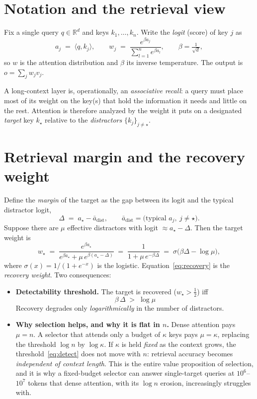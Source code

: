 \documentclass[11pt]{article}
\numberwithin{equation}{section}
\newcommand{\R}{\mathbb{R}}
\newcommand{\inner}[2]{\langle #1, #2\rangle}
\begin{document}
\section{Notation and the retrieval view}

Fix a single query $q\in\R^d$ and keys $k_1,\dots,k_n$. Write the \emph{logit} (score) of key $j$ as
\[
a_j \;=\; \inner{q}{k_j}, \qquad
w_j \;=\; \frac{e^{\beta a_j}}{\sum_{l=1}^n e^{\beta a_l}}, \qquad \beta = \tfrac{1}{\sqrt d},
\]
so $w$ is the attention distribution and $\beta$ its inverse temperature. The output is $o=\sum_j w_j v_j$.

A long-context layer is, operationally, an \emph{associative recall}: a query must place most of its weight on
the key(s) that hold the information it needs and little on the rest. Attention is therefore analyzed by the
weight it puts on a designated \emph{target} key $k_\star$ relative to the \emph{distractors}
$\{k_j\}_{j\neq\star}$.

\section{Retrieval margin and the recovery weight}\label{sec:margin}

Define the \emph{margin} of the target as the gap between its logit and the typical distractor logit,
\[
\Delta \;=\; a_\star - \bar a_{\text{dist}}, \qquad \bar a_{\text{dist}} = \text{(typical } a_j,\ j\neq\star).
\]
Suppose there are $\mu$ effective distractors with logit $\approx a_\star-\Delta$. Then the target weight is
\begin{equation}\label{eq:recovery}
w_\star \;=\; \frac{e^{\beta a_\star}}{e^{\beta a_\star}+\mu\,e^{\beta(a_\star-\Delta)}}
\;=\; \frac{1}{1+\mu\,e^{-\beta\Delta}}
\;=\; \sigma\!\big(\beta\Delta-\log\mu\big),
\end{equation}
where $\sigma(x)=1/(1+e^{-x})$ is the logistic. Equation~\eqref{eq:recovery} is the \emph{recovery weight}. Two
consequences:
\begin{itemize}
\item \textbf{Detectability threshold.} The target is recovered ($w_\star>\tfrac12$) iff
\begin{equation}\label{eq:detect}
\boxed{\;\beta\,\Delta \;>\; \log\mu\;}
\end{equation}
Recovery degrades only \emph{logarithmically} in the number of distractors.
\item \textbf{Why selection helps, and why it is flat in $n$.} Dense attention pays $\mu=n$. A selector that
  attends only a budget of $\kappa$ keys pays $\mu=\kappa$, replacing the threshold $\log n$ by $\log\kappa$.
  If $\kappa$ is held \emph{fixed} as the context grows, the threshold~\eqref{eq:detect} does not move with
  $n$: retrieval accuracy becomes \emph{independent of context length}. This is the entire value proposition of
  selection, and it is why a fixed-budget selector can answer single-target queries at $10^6$--$10^7$ tokens
  that dense attention, with its $\log n$ erosion, increasingly struggles with.
\end{itemize}
\end{document}
